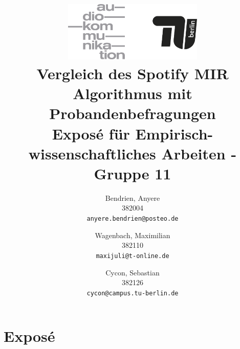 





\title{
    \includegraphics[width=0.5\textwidth]{fig/audiokommtu-01.png}\\
    Vergleich des Spotify MIR Algorithmus mit Probandenbefragungen\\
    \small{Exposé für Empirisch-wissenschaftliches Arbeiten - Gruppe 11}
}
\author
{
Bendrien, Anyere \\
382004\\
\small\texttt{anyere.bendrien@posteo.de}
\and
Wagenbach, Maximilian \\
382110\\
\small\texttt{maxijuli@t-online.de}
\and
Cycon, Sebastian \\
382126\\
\small\texttt{cycon@campus.tu-berlin.de}
}

\maketitle

\thispagestyle{empty} \newpage \setcounter{page}{1}


\section{Exposé}

\cite{Urbano2013}




